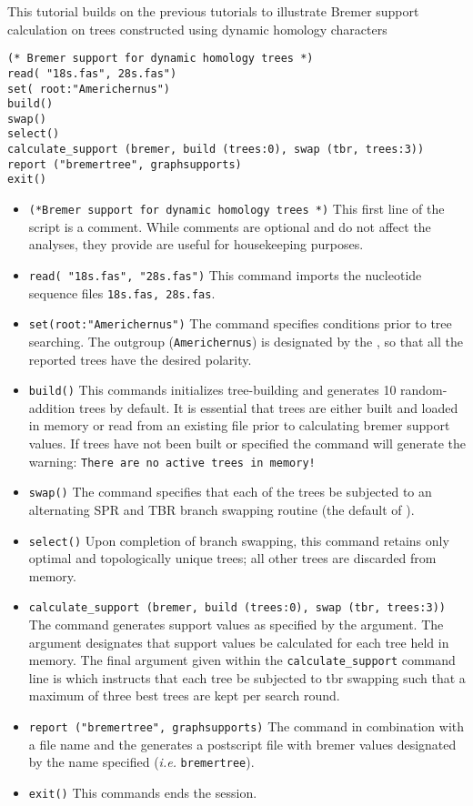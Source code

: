 This tutorial builds on the previous tutorials to illustrate Bremer support 
calculation on trees constructed using dynamic homology characters
    
   \begin{verbatim}
(* Bremer support for dynamic homology trees *)
read( "18s.fas", 28s.fas")
set( root:"Americhernus")
build()
swap()
select()
calculate_support (bremer, build (trees:0), swap (tbr, trees:3))
report ("bremertree", graphsupports)
exit()
\end{verbatim}

\begin{itemize}
\item \texttt{(*Bremer support for dynamic homology trees *)} This first line of the script is a comment. While comments are optional and do not affect the analyses, they provide are useful for housekeeping purposes.
\item \texttt{read( "18s.fas", "28s.fas")} This command imports the nucleotide sequence files \texttt{18s.fas, 28s.fas}.
\item \texttt{set(root:"Americhernus")} The  command specifies conditions prior to tree searching. The outgroup (\texttt{Americhernus}) is designated by the , so that all the reported trees have the desired polarity.     
\item \texttt{build()} This commands initializes tree-building and generates 10 random-addition trees by default.  It is essential that trees are either built and loaded in memory or read from an existing file prior to calculating bremer support values.  If trees have not been built or specified the  command will generate the warning: \texttt{There are no active trees in memory!} 
\item \texttt{swap()} The  command specifies that each of the trees be subjected to an alternating SPR and TBR branch swapping routine (the default of \poy).
\item \texttt{select()} Upon completion of branch swapping, this command retains only optimal and topologically unique trees; all other trees are discarded from memory. 
\item \texttt{calculate\_support (bremer, build (trees:0), swap (tbr, trees:3))} The  command generates support values as specified by the  argument. The  argument designates that support values be calculated for each tree held in memory.  The final argument given within the \texttt{calculate\_support} command line is  which instructs that each tree be subjected to tbr swapping such that a maximum of three best trees are kept per search round. 
\item \texttt{report ("bremertree", graphsupports)}  The  command in combination with a file name and the  generates a postscript file with bremer values designated by the name specified (\emph{i.e.} \texttt{bremertree}). 
\item \texttt{exit()} This commands ends the \poy session.
\end{itemize}

